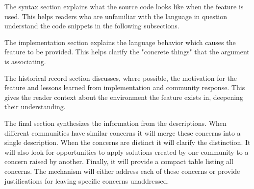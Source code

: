The syntax section explains what the source code looks like when the feature is used.
This helps readers who are unfamiliar with the language in question understand the code
snippets in the following subsections.

The implementation section explains the language behavior which causes the feature to be
provided.
This helps clarify the "concrete things" that the argument is associating.

The historical record section discusses, where possible, the motivation for the feature
and lessons learned from implementation and community response.
This gives the reader context about the environment the feature exists in, deepening their
understanding.

The final section synthesizes the information from the descriptions.
When different communities have similar concerns it will merge these concerns into a
single description.
When the concerns are distinct it will clarify the distinction.
It will also look for opportunities to apply solutions created by one community to a
concern raised by another.
Finally, it will provide a compact table listing all concerns.
The mechanism will either address each of these concerns or provide justifications for
leaving specific concerns unaddressed.
